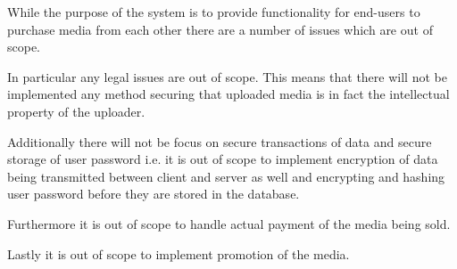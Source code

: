 \documentclass[../report.tex]{subfiles}
\begin{document}
While the purpose of the system is to provide functionality for end-users to purchase media from each other there are a number of issues which are out of scope. 

In particular any legal issues are out of scope. This means that there will not be implemented any method securing that uploaded media is in fact the intellectual property of the uploader. 

Additionally there will not be focus on secure transactions of data and secure storage of user password i.e. it is out of scope to implement encryption of data being transmitted between client and server as well and encrypting and hashing user password before they are stored in the database. 

Furthermore it is out of scope to handle actual payment of the media being sold.

Lastly it is out of scope to implement promotion of the media.
\end{document}
